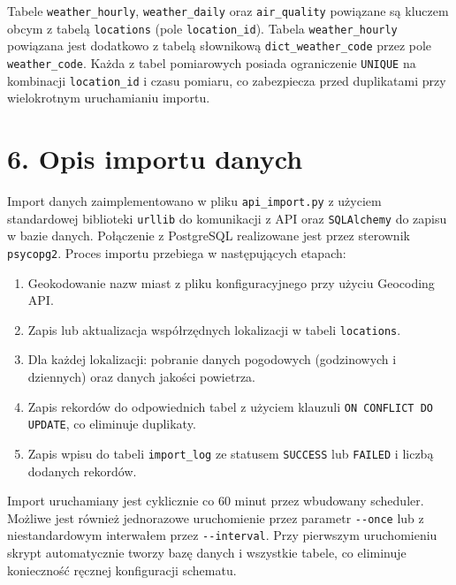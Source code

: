 \documentclass[12pt, a4paper]{article}
\begin{document}
Tabele \texttt{weather\_hourly}, \texttt{weather\_daily} oraz \texttt{air\_quality}
powiązane są kluczem obcym z tabelą \texttt{locations} (pole \texttt{location\_id}).
Tabela \texttt{weather\_hourly} powiązana jest dodatkowo z tabelą słownikową
\texttt{dict\_weather\_code} przez pole \texttt{weather\_code}.
Każda z tabel pomiarowych posiada ograniczenie \texttt{UNIQUE} na kombinacji
\texttt{location\_id} i czasu pomiaru, co zabezpiecza przed duplikatami
przy wielokrotnym uruchamianiu importu.


\section*{\textbf{6. Opis importu danych}}

Import danych zaimplementowano w pliku \texttt{api\_import.py} z użyciem
standardowej biblioteki \texttt{urllib} do komunikacji z API oraz \texttt{SQLAlchemy}
do zapisu w bazie danych. Połączenie z PostgreSQL realizowane jest przez sterownik
\texttt{psycopg2}. Proces importu przebiega w następujących etapach:

\begin{enumerate}
  \item Geokodowanie nazw miast z pliku konfiguracyjnego przy użyciu Geocoding API.
  \item Zapis lub aktualizacja współrzędnych lokalizacji w tabeli \texttt{locations}.
  \item Dla każdej lokalizacji: pobranie danych pogodowych (godzinowych i dziennych)
        oraz danych jakości powietrza.
  \item Zapis rekordów do odpowiednich tabel z użyciem klauzuli
        \texttt{ON CONFLICT DO UPDATE}, co eliminuje duplikaty.
  \item Zapis wpisu do tabeli \texttt{import\_log} ze statusem \texttt{SUCCESS}
        lub \texttt{FAILED} i liczbą dodanych rekordów.
\end{enumerate}

Import uruchamiany jest cyklicznie co 60 minut przez wbudowany scheduler.
Możliwe jest również jednorazowe uruchomienie przez parametr \texttt{-{}-once}
lub z niestandardowym interwałem przez \texttt{-{}-interval}. Przy pierwszym
uruchomieniu skrypt automatycznie tworzy bazę danych i wszystkie tabele,
co eliminuje konieczność ręcznej konfiguracji schematu.

\end{document}
